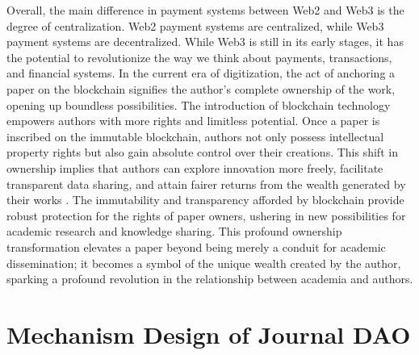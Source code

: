 \documentclass[lettersize,journal]{IEEEtran}
\begin{document}
Overall, the main difference in payment systems between Web2 and Web3 is the degree of centralization. Web2 payment systems are centralized, while Web3 payment systems are decentralized. While Web3 is still in its early stages, it has the potential to revolutionize the way we think about payments, transactions, and financial systems.
In the current era of digitization, the act of anchoring a paper on the blockchain signifies the author's complete ownership of the work, opening up boundless possibilities. The introduction of blockchain technology empowers authors with more rights and limitless potential. Once a paper is inscribed on the immutable blockchain, authors not only possess intellectual property rights but also gain absolute control over their creations. This shift in ownership implies that authors can explore innovation more freely, facilitate transparent data sharing, and attain fairer returns from the wealth generated by their works \cite{wang2023decentralized}. The immutability and transparency afforded by blockchain provide robust protection for the rights of paper owners, ushering in new possibilities for academic research and knowledge sharing. This profound ownership transformation elevates a paper beyond being merely a conduit for academic dissemination; it becomes a symbol of the unique wealth created by the author, sparking a profound revolution in the relationship between academia and authors.




  
\section{Mechanism Design of Journal DAO}

\end{document}
